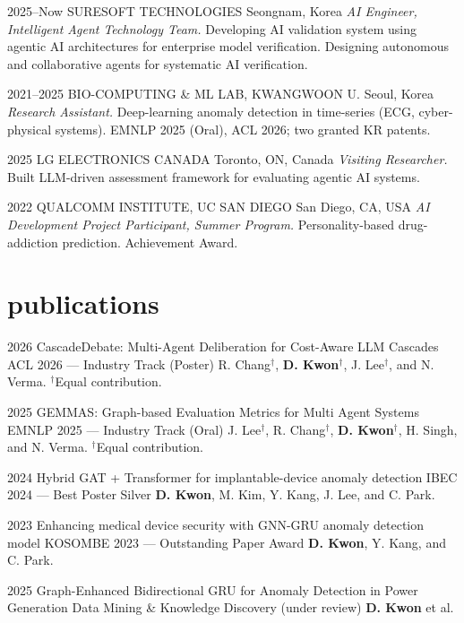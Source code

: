 \documentclass[]{cv-friggeri-x}
\begin{document}
\begin{entrylist}
\entry
  {2025--Now}
  {SURESOFT TECHNOLOGIES}
  {Seongnam, Korea}
  {\emph{AI Engineer, Intelligent Agent Technology Team.} Developing AI validation system using agentic AI architectures for enterprise model verification. Designing autonomous and collaborative agents for systematic AI verification. }

\entry
  {2021--2025}
  {BIO-COMPUTING \& ML LAB, KWANGWOON U.}
  {Seoul, Korea}
  {\emph{Research Assistant.} Deep-learning anomaly detection in time-series (ECG, cyber-physical systems). EMNLP 2025 (Oral), ACL 2026; two granted KR patents. }

\entry
  {2025}
  {LG ELECTRONICS CANADA}
  {Toronto, ON, Canada}
  {\emph{Visiting Researcher.} Built LLM-driven assessment framework for evaluating agentic AI systems. }

\entry
  {2022}
  {QUALCOMM INSTITUTE, UC SAN DIEGO}
  {San Diego, CA, USA}
  {\emph{AI Development Project Participant, Summer Program.} Personality-based drug-addiction prediction. Achievement Award. }

\end{entrylist}

\section{publications}

\begin{entrylist}
\entry
  {2026}
  {CascadeDebate: Multi-Agent Deliberation for Cost-Aware LLM Cascades}
  {ACL 2026 --- Industry Track (Poster)}
  {R. Chang$^{\dagger}$, \textbf{D. Kwon}$^{\dagger}$, J. Lee$^{\dagger}$, and N. Verma. $^{\dagger}$Equal contribution.}

\entry
  {2025}
  {GEMMAS: Graph-based Evaluation Metrics for Multi Agent Systems}
  {EMNLP 2025 --- Industry Track (Oral)}
  {J. Lee$^{\dagger}$, R. Chang$^{\dagger}$, \textbf{D. Kwon}$^{\dagger}$, H. Singh, and N. Verma. $^{\dagger}$Equal contribution.}

\entry
  {2024}
  {Hybrid GAT + Transformer for implantable-device anomaly detection}
  {IBEC 2024 --- Best Poster Silver}
  {\textbf{D. Kwon}, M. Kim, Y. Kang, J. Lee, and C. Park.}

\entry
  {2023}
  {Enhancing medical device security with GNN-GRU anomaly detection model}
  {KOSOMBE 2023 --- Outstanding Paper Award}
  {\textbf{D. Kwon}, Y. Kang, and C. Park.}

\entry
  {2025}
  {Graph-Enhanced Bidirectional GRU for Anomaly Detection in Power Generation}
  {Data Mining \& Knowledge Discovery (under review)}
  {\textbf{D. Kwon} et al.}

\end{entrylist}
\end{document}
